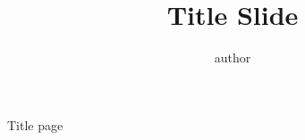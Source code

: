 \documentclass{beamer}
\title{Title Slide}
\author{author}
\begin{document}
\begin{frame}[plain]
    \maketitle
\end{frame}

\begin{frame}{Title page}

\end{frame}
\end{document}
